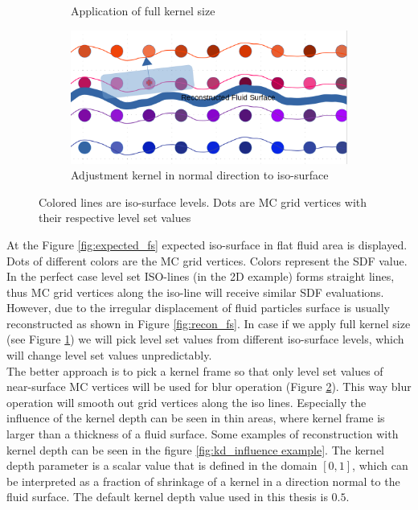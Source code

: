 \begin{figure}[H]
\begin{subfigure}[b]{0.5\textwidth}
               \caption{Application of full kernel size}
               \label{fig:full_ks}
        \end{subfigure}
        \begin{subfigure}[b]{0.5\textwidth}
               \includegraphics[width=\textwidth]{figures/LevelSetBlurKernelPart.png}
               \caption{Adjustment kernel in normal direction to iso-surface}
				\label{fig:partial_ks}
        \end{subfigure}

       \caption{Colored lines are iso-surface levels. Dots are MC grid vertices with their respective level set values}
       \label{fig:kd_surface_explenation}
 \end{figure}
At the Figure \ref{fig:expected_fs} expected iso-surface in flat fluid area is displayed. Dots of different colors are the MC grid vertices. Colors represent the SDF value. In the perfect case level set ISO-lines (in the 2D example) forms straight lines, thus MC grid vertices along the iso-line will receive similar SDF evaluations. However, due to the irregular displacement of fluid particles surface is usually reconstructed as shown in Figure \ref{fig:recon_fs}. In case if we apply full kernel size (see Figure \ref{fig:full_ks}) we will pick level set values from different iso-surface levels, which will change level set values unpredictably.\\
The better approach is to pick a kernel frame so that only level set values of near-surface MC vertices will be used for blur operation (Figure \ref{fig:partial_ks}). This way blur operation will smooth out grid vertices along the iso lines. Especially the influence of the kernel depth can be seen in thin areas, where kernel frame is larger than a thickness of a fluid surface. Some examples of reconstruction with kernel depth can be seen in the figure \ref{fig:kd_influence example}. The kernel depth parameter is a scalar value that is defined in the domain $[0, 1]$, which can be interpreted as a fraction of shrinkage of a kernel in a direction normal to the fluid surface. The default kernel depth value used in this thesis is $0.5$.
